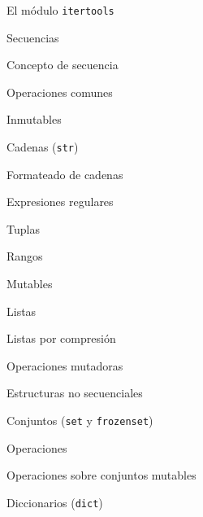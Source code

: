 \begin{longenum}
\begin{longenum}
\begin{longenum}
\begin{longenum}
                \item El módulo \texttt{itertools}
            \end{longenum}
        \end{longenum}
        \item Secuencias
        \begin{longenum}
            \item Concepto de secuencia
            \item Operaciones comunes
            \item Inmutables
            \begin{longenum}
                \item Cadenas (\texttt{str})
                \begin{longenum}
                    \item Formateado de cadenas
                    \item Expresiones regulares
                \end{longenum}
                \item Tuplas
                \item Rangos
            \end{longenum}
            \item Mutables
            \begin{longenum}
                \item Listas
                \begin{longenum}
                    \item Listas por compresión
                \end{longenum}
                \item Operaciones mutadoras
            \end{longenum}
        \end{longenum}
        \item Estructuras no secuenciales
        \begin{longenum}
            \item Conjuntos (\texttt{set} y \texttt{frozenset})
            \begin{longenum}
                \item Operaciones
                \item Operaciones sobre conjuntos mutables
            \end{longenum}
            \item Diccionarios (\texttt{dict})
            \begin{longenum}

\end{longenum}
\end{longenum}
\end{longenum}
\end{longenum}
